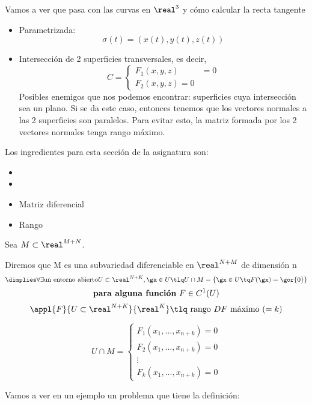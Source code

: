   Vamos a ver que pasa con las curvas en $\real^3$ y cómo calcular la recta tangente
  
  \begin{itemize}
   \item Parametrizada: \[\sigma(t) = (x(t),y(t),z(t))\]   
   \item Intersección de 2 superficies transversales, es decir,   
   \[C = \left\{\begin{array}{cc} F_1(x,y,z) &= 0\\ F_2(x,y,z) = 0 \end{array} \right.\]   
   Posibles enemigos que nos podemos encontrar: superficies cuya intersección sea un plano. Si se da este caso, entonces tenemos que los vectores normales a las 2 superficies son paralelos. Para evitar esto, la matriz formada por los 2 vectores normales tenga rango máximo.                                                                   
  \end{itemize}

  Los ingredientes para esta sección de la asignatura son:
  \begin{itemize}
    \item
    \item
   \item Matriz diferencial
   \item Rango
  \end{itemize}

  
  \begin{defn}
  Sea $M \subset \real^{M+N}$.
  
  Diremos que M es una subvariedad diferenciable en $\real^{N+M}$ de dimensión n \[\dimplies \forall \exists \text{un entorno abierto} U \subset \real^{N+K}, \ga \in U \tlq U\cap M = \{\gx\in U\tq F(\gx) = \gor{0}\} \]\[\text{\textbf{para alguna función} } F\in C^1(U)\]
  \[\appl{F}{U\subset \real^{N+K}}{\real^K} \tlq \text{ rango } DF \text{ máximo } (=k)\]
  
  \[U\cap M = \left\{\begin{array}{cc}
                     F_1(x_1,...,x_{n+k}) = 0\\
                     F_2(x_1,...,x_{n+k}) = 0\\
                     \vdots\\
                     F_k(x_1,...,x_{n+k}) = 0
                    \end{array}\right.\] 
  \end{defn}
  Vamos a ver en un ejemplo un problema que tiene la definición:  
